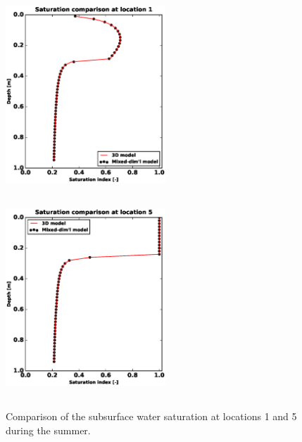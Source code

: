 \documentclass[review]{elsarticle}
\begin{document}


 \begin{figure}[!htpb]
\centering
\includegraphics[height = 7.5cm, width=6cm]{figures/comparison/regular/ss-sat/comp-sat-loc1-cycle0020.eps}
\includegraphics[height = 7.5cm, width=6cm]{figures/comparison/regular/ss-sat/comp-sat-loc5-cycle0020.eps}
\caption{Comparison of the subsurface water saturation at locations 1 and 5 during the summer.}
\label{ss-sat-comp}
\end{figure}
\end{document}
